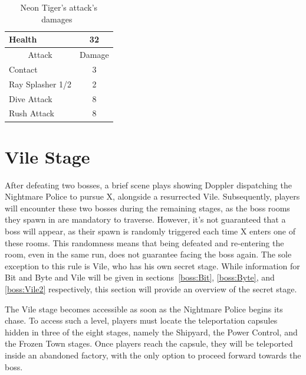 \begin{table}[htp]
	\centering
	\begin{tabular}[h]{l c}
		\toprule
		Health  & 32\\
		\midrule
		\multicolumn{1}{c}{Attack} & \multicolumn{1}{c}{Damage}\\
		Contact & 3\\
		Ray Splasher 1/2& 2\\
		Dive Attack& 8\\
		Rush Attack& 8\\
		\bottomrule
	\end{tabular}
	\caption{Neon Tiger's attack's damages~\cite{wiki:Neon_tiger,book:Compendium}}
\end{table} 


\section{Vile Stage}\label{stage:Vile}

After defeating two bosses, a brief scene plays showing Doppler dispatching the Nightmare Police to pursue X, alongside a resurrected Vile. Subsequently, players will encounter these two bosses during the remaining stages, as the boss rooms they spawn in are mandatory to traverse. However, it's not guaranteed that a boss will appear, as their spawn is randomly triggered each time X enters one of these rooms. This randomness means that being defeated and re-entering the room, even in the same run, does not guarantee facing the boss again. The sole exception to this rule is Vile, who has his own secret stage. While information for Bit and Byte and Vile will be given in sections~\ref{boss:Bit}, \ref{boss:Byte}, and \ref{boss:Vile2} respectively, this section will provide an overview of the secret stage.

The Vile stage becomes accessible as soon as the Nightmare Police begins its chase. To access such a level, players must locate the teleportation capsules hidden in three of the eight stages, namely the Shipyard, the Power Control, and the Frozen Town stages. Once players reach the capsule, they will be teleported inside an abandoned factory, with the only option to proceed forward towards the boss.

